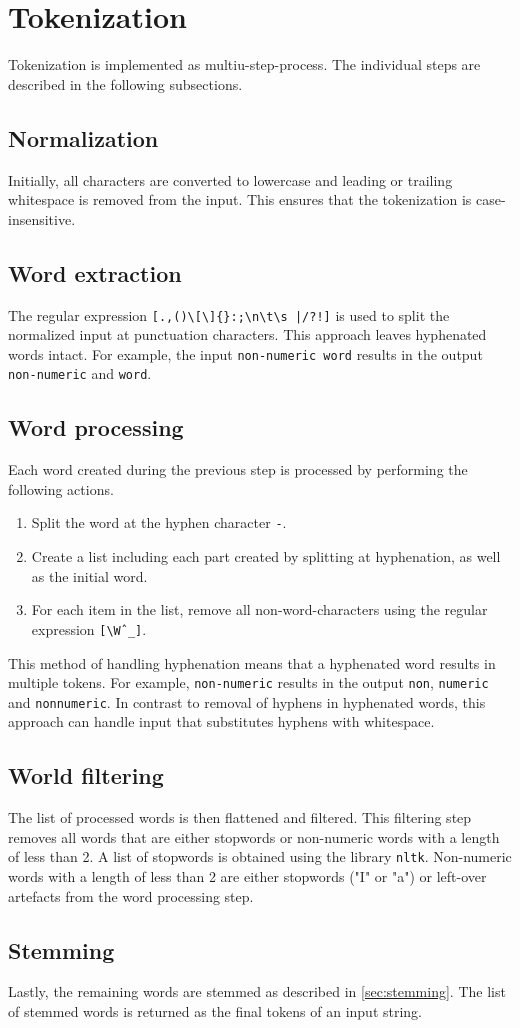 \section{Tokenization}
\label{sec:tokenization}

Tokenization is implemented as multiu-step-process.
The individual steps are described in the following subsections.

\subsection{Normalization}
Initially, all characters are converted to lowercase and leading or trailing whitespace is removed from the input.
This ensures that the tokenization is case-insensitive.

\subsection{Word extraction}
The regular expression \verb=[.,()\[\]{}:;\n\t\s |/?!]= is used to split the normalized input at punctuation characters.
This approach leaves hyphenated words intact.
For example, the input \verb|non-numeric word| results in the output \verb|non-numeric| and \verb|word|.

\subsection{Word processing}
Each word created during the previous step is processed by performing the following actions.

\begin{enumerate}
  \item Split the word at the hyphen character \verb|-|.
  \item Create a list including each part created by splitting at hyphenation, as well as the initial word.
  \item For each item in the list, remove all non-word-characters using the regular expression \verb|[\Wˆ_]|.
\end{enumerate}

This method of handling hyphenation means that a hyphenated word results in multiple tokens.
For example, \verb|non-numeric| results in the output \verb|non|, \verb|numeric| and \verb|nonnumeric|.
In contrast to removal of hyphens in hyphenated words, this approach can handle input that substitutes hyphens with whitespace.

\subsection{World filtering}
The list of processed words is then flattened and filtered.
This filtering step removes all words that are either stopwords or non-numeric words with a length of less than 2.
A list of stopwords is obtained using the library \verb|nltk|.
Non-numeric words with a length of less than 2 are either stopwords ("I" or "a") or left-over artefacts from the word processing step.

\subsection{Stemming}
Lastly, the remaining words are stemmed as described in \cref{sec:stemming}.
The list of stemmed words is returned as the final tokens of an input string.
